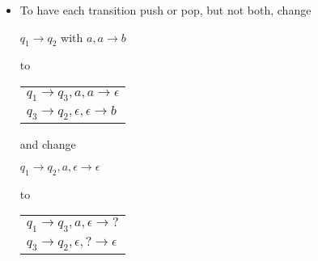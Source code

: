 \begin{frame}[allowframebreaks]
\begin{itemize} 
\item  To have each transition push or pop, but not both,
change
\begin{center}
$q_1 \rightarrow q_2$ with $a, a \rightarrow b$ 
\end{center}
to
\begin{center}
  \begin{tabular}{l}
$q_1 \rightarrow q_3, a, a \rightarrow \epsilon$\\
$q_3 \rightarrow q_2, \epsilon, \epsilon \rightarrow b$  
  \end{tabular}
\end{center}
and change 
\begin{center}
$q_1\rightarrow q_2, a, \epsilon \rightarrow \epsilon$ 
\end{center}
to
\begin{center}
  \begin{tabular}{l}
$q_1 \rightarrow q_3, a, \epsilon \rightarrow ?$ \\
$q_3 \rightarrow q_2, \epsilon, ? \rightarrow \epsilon$
  \end{tabular}
\end{center}
  \end{itemize}
\end{frame}








